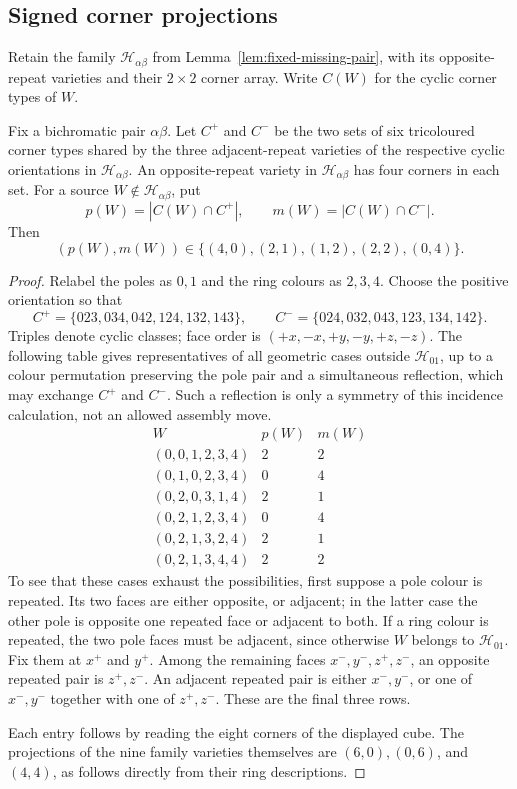 \subsection{Signed corner projections}
Retain the family $\mathcal H_{\alpha\beta}$ from Lemma~\ref{lem:fixed-missing-pair},
with its opposite-repeat varieties and their $2\times2$ corner array.
Write $C(W)$ for the cyclic corner types of $W$.

\begin{lemma}\label{lem:thin-projections}
Fix a bichromatic pair $\alpha\beta$.  Let $C^+$ and $C^-$ be the two sets of six
tricoloured corner types shared by the three adjacent-repeat varieties of
the respective cyclic orientations in $\mathcal H_{\alpha\beta}$.  An
opposite-repeat variety in $\mathcal H_{\alpha\beta}$ has four corners in each set.
For a source $W\notin\mathcal H_{\alpha\beta}$, put
\[
 p(W)=|C(W)\cap C^+|,\qquad m(W)=|C(W)\cap C^-|.
\]
Then
\[
 (p(W),m(W))\in\{(4,0),(2,1),(1,2),(2,2),(0,4)\}.
\]
\end{lemma}

\begin{proof}
Relabel the poles as $0,1$ and the ring colours as $2,3,4$.  Choose the
positive orientation so that
\[
 C^+=\{023,034,042,124,132,143\},\qquad
 C^-=\{024,032,043,123,134,142\}.
\]
Triples denote cyclic classes; face order is $(+x,-x,+y,-y,+z,-z)$.  The following table gives representatives of
all geometric cases outside $\mathcal H_{01}$, up to a colour permutation
preserving the pole pair and a simultaneous reflection, which may exchange
$C^+$ and $C^-$.  Such a reflection is only a symmetry of this incidence
calculation, not an allowed assembly move.
\[
\begin{array}{c|cc}
 W&p(W)&m(W)\\\hline
 (0,0,1,2,3,4)&2&2\\
 (0,1,0,2,3,4)&0&4\\
 (0,2,0,3,1,4)&2&1\\
 (0,2,1,2,3,4)&0&4\\
 (0,2,1,3,2,4)&2&1\\
 (0,2,1,3,4,4)&2&2
\end{array}
\]
To see that these cases exhaust the possibilities, first suppose a pole
colour is repeated.  Its two faces are either opposite, or adjacent; in
the latter case the other pole is opposite one repeated face or adjacent
to both.  If a ring colour is repeated, the two pole faces must be
adjacent, since otherwise $W$ belongs to $\mathcal H_{01}$.  Fix them at
$x^+$ and $y^+$.  Among the remaining faces $x^-,y^-,z^+,z^-$, an opposite
repeated pair is $z^+,z^-$.  An adjacent repeated pair is either $x^-,y^-$,
or one of $x^-,y^-$ together with one of $z^+,z^-$.  These are the final
three rows.

Each entry follows by reading the eight corners of the displayed cube.
The projections of the nine family
varieties themselves are $(6,0),(0,6)$, and $(4,4)$, as follows directly
from their ring descriptions.
\end{proof}

